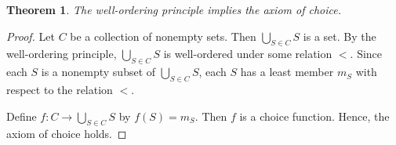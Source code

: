 \documentclass[12pt]{article}
\newtheorem*{thm*}{Theorem}
\begin{document}
\begin{thm*}
The well-ordering principle implies the axiom of choice.
\end{thm*}

\begin{proof}
Let $C$ be a collection of nonempty sets.  Then $\displaystyle \bigcup_{S \in C} S$ is a set.  By the well-ordering principle, $\displaystyle \bigcup_{S \in C} S$ is well-ordered under some relation $<$.  Since each $S$ is a nonempty subset of $\displaystyle \bigcup_{S \in C} S$, each $S$ has a least member $m_S$ with respect to the relation $<$.

Define $\displaystyle f \colon C \to \bigcup_{S \in C} S$ by $f(S)=m_S$.  Then $f$ is a choice function.  Hence, the axiom of choice holds.
\end{proof}
\end{document}
